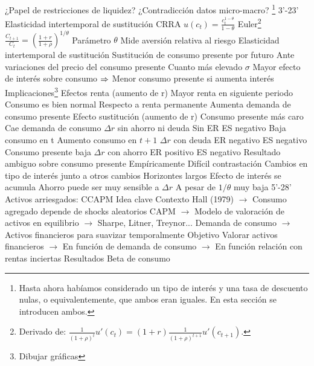 \documentclass{nuevotema}
\begin{document}
\begin{esquemal}
				\4 ¿Papel de restricciones de liquidez?
				\4 ¿Contradicción datos micro-macro?
	\1 \footnote{Hasta ahora habíamos considerado un tipo de interés y una tasa de descuento nulas, o equivalentemente, que ambos eran iguales. En esta sección se introducen ambos.} 3'-23'
		\2 Elasticidad intertemporal de sustitución
			\3 CRRA
				\4 $u(c_t) = \frac{c_t^{1-\theta}}{1-\theta}$
			\3 Euler\footnote{Derivado de: $\frac{1}{(1+\rho)^t} u'(c_t) = (1+r) \frac{1}{(1+\rho)^{t+1}} u'(c_{t+1})$.}
				\4 $\frac{C_{t+1}}{C_t} = \left( \frac{1+r}{1+\rho} \right)^{1/\theta}$
			\3 Parámetro $\theta$
				\4 Mide aversión relativa al riesgo
			\3 Elasticidad intertemporal de sustitución
				\4 Sustitución de consumo presente por futuro
				\4[] Ante variaciones del precio del consumo presente
				\4[] 
				\4 Cuanto más elevado $\sigma$
				\4[] Mayor efecto de interés sobre consumo
				\4[] $\then$ Menor consumo presente si aumenta interés
		\2 Implicaciones\footnote{Dibujar gráficas}
			\3 Efectos renta (aumento de r)
				\4 Mayor renta en siguiente periodo
				\4 Consumo es bien normal
				\4[] Respecto a renta permanente
				\4[$\then$] Aumenta demanda de consumo presente
			\3 Efecto sustitución (aumento de r)
				\4 Consumo presente más caro
				\4[$\then$] Cae demanda de consumo
			\3 $\varDelta r$ sin ahorro ni deuda
				\4 Sin ER
				\4 ES negativo
				\4 Baja consumo en t
				\4 Aumento consumo en $t+1$
			\3 $\varDelta r$ con deuda
				\4 ER negativo
				\4 ES negativo
				\4 Consumo presente baja
			\3 $\varDelta r$ con ahorro
				\4 ER positivo
				\4 ES negativo
				\4 Resultado ambiguo sobre consumo presente
		\2 Empíricamente
			\3 Difícil contrastación
				\4 Cambios en tipo de interés junto a otros cambios
			\3 Horizontes largos
				\4 Efecto de interés se acumula
				\4 Ahorro puede ser muy sensible a $\varDelta r$
				\4[] A pesar de $1/\theta$ muy baja
	\1  5'-28'
		\2 Activos arriesgados: CCAPM
			\3 Idea clave
				\4 Contexto
				\4[] Hall (1979)
				\4[] $\to$ Consumo agregado depende de shocks aleatorios
				\4[] CAPM
				\4[] $\to$ Modelo de valoración de activos en equilibrio
				\4[] $\to$ Sharpe, Litner, Treynor...
				\4[] Demanda de consumo
				\4[] $\to$ Activos financieros para suavizar temporalmente
				\4 Objetivo
				\4[] Valorar activos financieros
				\4[] $\to$ En función de demanda de consumo
				\4[] $\to$ En función relación con rentas inciertas
				\4 Resultados
				\4[] Beta de consumo

\end{esquemal}
\end{document}
